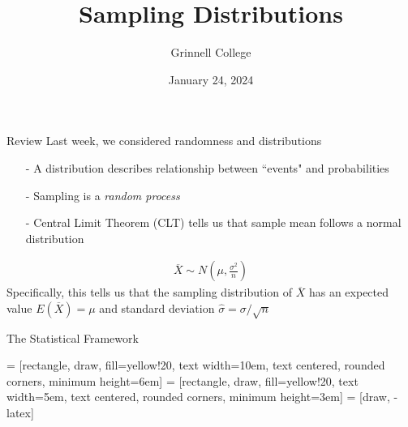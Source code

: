 \documentclass{beamer}
\title[STA-209]{Sampling Distributions}
\subtitle{}
\author{Grinnell College}
\date{January 24, 2024}
\begin{document}
\begin{frame}
  \titlepage
\end{frame}

\begin{frame}{Review}
Last week, we considered randomness and distributions


\begin{itemize}
\item[-] A distribution describes relationship between ``events" and probabilities
\item[-] Sampling is a \textit{random process}
\item[-] Central Limit Theorem (CLT) tells us that sample mean follows a normal distribution
\end{itemize}
\begin{align*}
\overline{X} \sim N \left(\mu, \frac{\sigma^2}{n} \right)
\end{align*}
Specifically, this tells us that the sampling distribution of $\overline{X}$ has an expected value $E(\overline{X}) = \mu$ and standard deviation $\hat{\sigma} = \sigma/\sqrt{n}$
\end{frame}

\begin{frame}{The Statistical Framework}
\begin{center}
\usetikzlibrary{decorations.pathreplacing,positioning, arrows, shapes, calc,shapes.multipart}
 = [rectangle, draw, fill=yellow!20, 
    text width=10em, text centered, rounded corners, minimum height=6em]
 = [rectangle, draw, fill=yellow!20, 
    text width=5em, text centered, rounded corners, minimum height=3em]
 = [draw, -latex]
  \end{center}
\end{frame}
\end{document}
